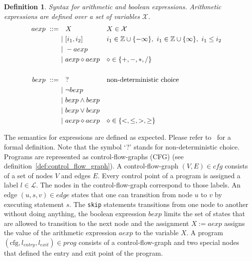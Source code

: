 \documentclass[11pt,a4paper,titlepage]{article}
\newtheorem{definition}{Definition}[section]
\begin{document}
\begin{definition}\label{def:arith_bool_syntax}
    Syntax for arithmetic and boolean expressions. 
    Arithmetic expressions are defined over a set of variables $\mathcal{X}$.
    \begin{align*}
        \setlength{\jot}{15pt}
        aexp \ ::= \ & \ \ X && X \in \mathcal{X} \\
        &| \  [i_1, i_2] && i_1 \in \mathbb{Z} \cup \{ -\infty \},\ i_1 \in \mathbb{Z} \cup \{\infty \},\ i_1 \leq i_2  \\
        &| \  - aexp \\
        &| \  aexp \diamond aexp && \diamond \in \{ +, -, *, / \}\\
        \\
        bexp \ ::= \ & \ \ ?  && \text{non-deterministic choice} \\
        &| \  \neg bexp \\
        &| \  bexp \land bexp \\
        &| \  bexp \lor bexp \\
        &| \  aexp \diamond aexp && \diamond \in \{<, \leq, >, \geq \}\\
    \end{align*}
\end{definition}

The semantics for expressions are defined as expected. 
Please refer to~\cite{UrbanPhd} for a formal definition. 
Note that the symbol `?' stands for non-deterministic choice.\\

Programs are represented as control-flow-graphs (CFG) (see definition~\ref{def:control_flow_graph}). 
A control-flow-graph $(V, E) \in cfg$ consists of a set of nodes $V$ and edges $E$.
Every control point of a program is assigned a label $l \in \mathcal{L}$. 
The nodes in the control-flow-graph correspond to those labels. 
An edge $(u, s, v) \in edge$ states that one can transition from node
$u$ to $v$ by executing statement $s$. 
The \texttt{skip} statements 
transitions from one node to another without doing anything, the boolean expression $bexp$ limits the set of states
that are allowed to transition to the next node and the assignment $X := aexp$ assigns the value of the arithmetic expression $aexp$
to the variable $X$. A program $(\text{cfg}, l_{entry}, l_{exit}) \in prog$ consists of a control-flow-graph and two special 
nodes that defined the entry and exit point of the program.
\end{document}

